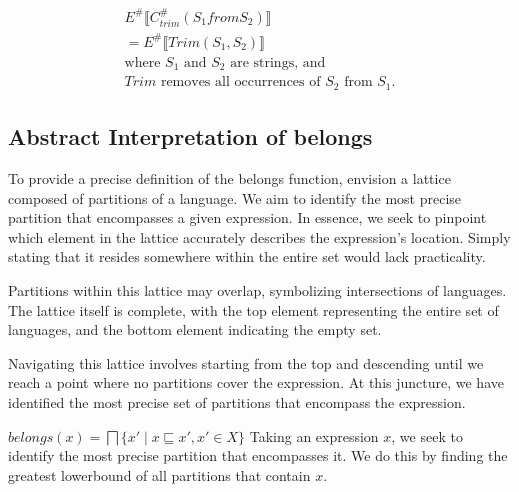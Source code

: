 \begin{align*}
    E^\# \llbracket C_{trim}^\# (S_1 from S_2) \rrbracket \\
    = E^\# \llbracket Trim(S_1, S_2) \rrbracket \\
    \text{where } S_1 \text{ and } S_2 \text{ are strings, and }\\
    Trim \text{ removes all occurrences of } S_2 \text{ from } S_1.
\end{align*}




\subsection{Abstract Interpretation of belongs}
To provide a precise definition of the belongs function, envision a lattice composed of partitions of a language. We aim to identify the most precise partition that encompasses a given expression. In essence, we seek to pinpoint which element in the lattice accurately describes the expression's location. Simply stating that it resides somewhere within the entire set would lack practicality.

Partitions within this lattice may overlap, symbolizing intersections of languages. The lattice itself is complete, with the top element representing the entire set of languages, and the bottom element indicating the empty set.

Navigating this lattice involves starting from the top and descending until we reach a point where no partitions cover the expression. At this juncture, we have identified the most precise set of partitions that encompass the expression.

$ belongs(x)=\bigsqcap\{x' \mid x \sqsubseteq x', x' \in X\} $
Taking an expression $x$, we seek to identify the most precise partition that encompasses it. We do this by finding the greatest lowerbound of all partitions that contain $x$.

